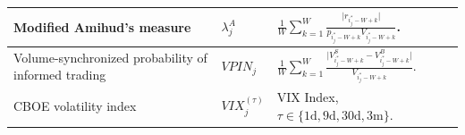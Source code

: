 \documentclass[10pt,a4paper,oneside]{article}
\begin{document}
\begin{longtable}{|p{4cm}|p{2.25cm}|p{5.25cm}|p{2.25cm}|}
    Modified Amihud's measure                                                                                                                                              &
    $\lambda^A_j$                                                                                                                                                          &
    $\frac{1}{W} \sum^W_{k = 1} \frac{\big| r_{i^*_j - W + k} \big|}{p_{i^*_j - W + k} V_{i^*_j - W + k}}$.                                                                &
    \cite{barardehi2018trade, easley2021microstructure}                                                                                                                                                                                                                                                                                                                                        \\ \hline

    Volume-synchronized probability of informed trading                                                                                                                    &
    $VPIN_j$                                                                                                                                                               &
    $\frac{1}{W} \sum^W_{k = 1} \frac{\big| V_{i^*_j - W + k}^S - V^B_{i^*_j - W + k} \big|}{V_{i^*_j - W + k}}$.                                                          &
    \cite{EASLEY2016269, easley2021microstructure}                                                                                                                                                                                                                                                                                                                                             \\ \hline

    CBOE volatility index                                                                                                                                                  &
    $VIX^{(\tau)}_j$                                                                                                                                                       &
    VIX Index, $\tau \in \{1\text{d}, 9\text{d}, 30\text{d}, 3\text{m} \}$.                                                                                                &
    \cite{easley2021microstructure}                                                                                                                                                                                                                                                                                                                                                            \\ \hline


\end{longtable}
\end{document}
